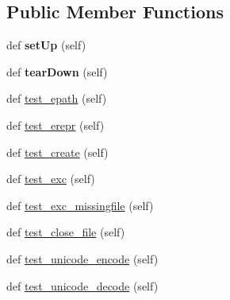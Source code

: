 \subsection*{Public Member Functions}
\begin{DoxyCompactItemize}
\item 
\mbox{\label{classh5py__LOCAL_1_1tests_1_1old_1_1test__group_1_1TestExternalLinks_af9b9d1a41d741f314d67defd12c9d1d0}} 
def {\bfseries set\+Up} (self)
\item 
\mbox{\label{classh5py__LOCAL_1_1tests_1_1old_1_1test__group_1_1TestExternalLinks_a5c07aeacf84de29ddd3c00d1a4abfed5}} 
def {\bfseries tear\+Down} (self)
\item 
def \hyperlink{classh5py__LOCAL_1_1tests_1_1old_1_1test__group_1_1TestExternalLinks_ae1d9bc3aa851842723dc648e2727b945}{test\+\_\+epath} (self)
\item 
def \hyperlink{classh5py__LOCAL_1_1tests_1_1old_1_1test__group_1_1TestExternalLinks_a79313cb17375f95a2fedeea15d1c5b60}{test\+\_\+erepr} (self)
\item 
def \hyperlink{classh5py__LOCAL_1_1tests_1_1old_1_1test__group_1_1TestExternalLinks_af6bfbca98fa7ee0c3b0e8733f13fbec4}{test\+\_\+create} (self)
\item 
def \hyperlink{classh5py__LOCAL_1_1tests_1_1old_1_1test__group_1_1TestExternalLinks_a057dcbf2759eb0715c11490c1cab9c50}{test\+\_\+exc} (self)
\item 
def \hyperlink{classh5py__LOCAL_1_1tests_1_1old_1_1test__group_1_1TestExternalLinks_aded3592040d3cd0e8a3d332b8be59ea7}{test\+\_\+exc\+\_\+missingfile} (self)
\item 
def \hyperlink{classh5py__LOCAL_1_1tests_1_1old_1_1test__group_1_1TestExternalLinks_a92e251ae5195aced4e87eb8a44a69ea7}{test\+\_\+close\+\_\+file} (self)
\item 
def \hyperlink{classh5py__LOCAL_1_1tests_1_1old_1_1test__group_1_1TestExternalLinks_a43264de9242606060ab9242c29bfb884}{test\+\_\+unicode\+\_\+encode} (self)
\item 
def \hyperlink{classh5py__LOCAL_1_1tests_1_1old_1_1test__group_1_1TestExternalLinks_af1ee520118f193f898a63ca514680fde}{test\+\_\+unicode\+\_\+decode} (self)
\end{DoxyCompactItemize}
